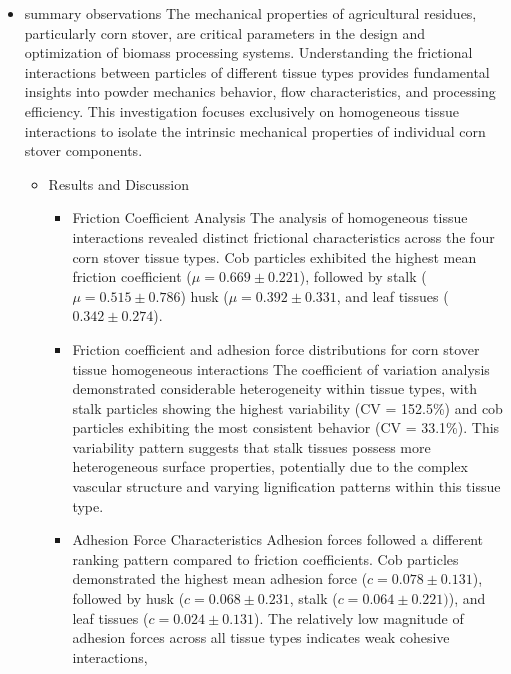 \documentclass[xcolor=dvipsnames,10pt,hidelinks]{article}
\begin{document}
\begin{itemize}
\item summary observations
\label{sec:orgf08c9a6}
\begingroup\footnotesize
The mechanical properties of agricultural residues, particularly corn stover, are critical parameters in the design and optimization of biomass processing systems. Understanding the frictional interactions between particles of different tissue types provides fundamental insights into powder mechanics behavior, flow characteristics, and processing efficiency. This investigation focuses exclusively on homogeneous tissue interactions to isolate the intrinsic mechanical properties of individual corn stover components.
\begin{itemize}
\item Results and Discussion
\label{sec:org14c0a6a}
\begin{itemize}
\item Friction Coefficient Analysis \newline
\label{sec:org37a7087}
The analysis of homogeneous tissue interactions revealed distinct frictional characteristics across the four corn stover tissue types. Cob particles exhibited the highest mean friction coefficient (\(\mu = 0.669 \pm 0.221\)), followed by stalk (\(\mu = 0.515 \pm 0.786\)) husk (\(\mu = 0.392 \pm 0.331\), and leaf tissues (\(0.342 \pm 0.274\)).
\item Friction coefficient and adhesion force distributions for corn stover tissue homogeneous interactions \newline
\label{sec:orgaa59af3}
The coefficient of variation analysis demonstrated considerable heterogeneity within tissue types, with stalk particles showing the highest variability (CV = 152.5\%) and cob particles exhibiting the most consistent behavior (CV = 33.1\%). This variability pattern suggests that stalk tissues possess more heterogeneous surface properties, potentially due to the complex vascular structure and varying lignification patterns within this tissue type.
\item Adhesion Force Characteristics \newline
\label{sec:org05afe1e}
Adhesion forces followed a different ranking pattern compared to friction coefficients. Cob particles demonstrated the highest mean adhesion force (\(c = 0.078 \pm 0.131\)), followed by husk (\(c= 0.068 \pm 0.231\), stalk (\(c = 0.064 \pm 0.221)\)), and leaf tissues (\(c = 0.024 \pm 0.131\)).
The relatively low magnitude of adhesion forces across all tissue types indicates weak cohesive interactions,

\end{itemize}
\end{itemize}
\end{itemize}
\end{document}
